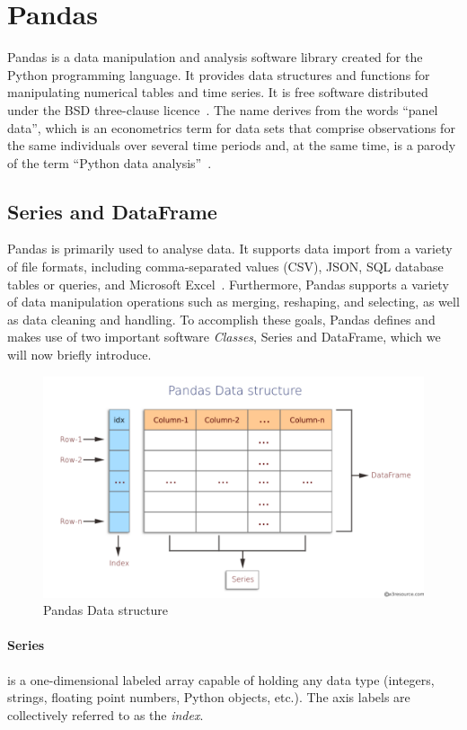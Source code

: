 \section{Pandas}
Pandas is a data manipulation and analysis software library created for the Python programming language. It provides data structures and functions for manipulating numerical tables and time series. It is free software distributed under the BSD three-clause licence~\cite{Misc:OpenLDAP_license:oldap-2.7}.
The name derives from the words ``panel data'', which is an econometrics term for data sets that comprise observations for the same individuals over several time periods and, at the same time, is a parody of the term ``Python data analysis''~\cite{mckinney_data_2010}.

\subsection{Series and DataFrame}
Pandas is primarily used to analyse data. It supports data import from a variety of file formats, including comma-separated values (CSV), JSON, SQL database tables or queries, and Microsoft Excel~\cite{Misc:pandas_docs}.
Furthermore, Pandas supports a variety of data manipulation operations such as merging, reshaping, and selecting, as well as data cleaning and handling.
To accomplish these goals, Pandas defines and makes use of two important software \textit{Classes}, Series and DataFrame, which we will now briefly introduce.
\begin{figure}[ht]
    \centering
    \includegraphics[width=\textwidth]{content/chapter_3/images/datastructure.pdf}
    \caption{Pandas Data structure}
    \label{fig:pandas_dataframe}
\end{figure}

\paragraph{Series} is a one-dimensional labeled array capable of holding any data type (integers, strings, floating point numbers, Python objects, etc.). 
The axis labels are collectively referred to as the \textit{index}.


